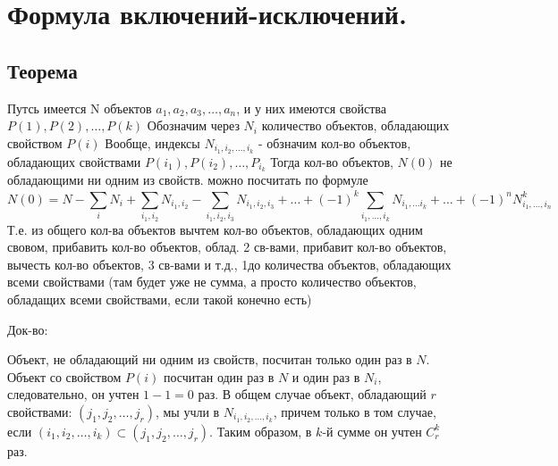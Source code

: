 \section{Формула включений-исключений.}

\subsection{Теорема}

Путсь имеется N объектов $a_1, a_2, a_3, \ldots, a_n$, и у них имеются свойства $P(1), P(2), \ldots ,P(k)$
Обозначим через $N_i$ количество объектов, обладающих свойством $P(i)$
Вообще, индексы $N_{i_1, i_2, \ldots, i_k}$ - обзначим кол-во объектов, 
обладающих свойствами $P(i_1), P(i_2), \ldots , P_{i_k}$
Тогда кол-во объектов, $N(0)$ не обладающими ни одним из свойств. можно посчитать по формуле
$$
N(0) =  N 
- \sum\limits_{i}^{} N_{i} 
+ \sum\limits_{i_1, i_2}^{} N_{i_1, i_2} 
- \sum\limits_{i_1, i_2, i_3}^{} N_{i_1, i_2, i_3} 
+ \ldots 
+ (-1)^k \sum\limits_{i_1, \ldots, i_k}^{} N_{i_1, \ldots i_k} 
+ \ldots
+ (-1)^n N_{i_1, \ldots, i_n}^{k}
$$
Т.е. из общего кол-ва объектов вычтем кол-во объектов, обладающих одним свовом, прибавить кол-во объектов, облад. 2 св-вами, прибавит кол-во объектов, вычесть кол-во объектов, 3 св-вами и т.д., 1до количества объектов, обладающих всеми свойствами (там будет уже не сумма, а просто количество объектов, обладащих всеми свойствами, если такой конечно есть)

Док-во:

Объект, не обладающий ни одним из свойств, посчитан только один раз в $N$. Объект со свойством $P(i)$ посчитан один раз в $N$ и один раз в $N_i$, следовательно, он учтен $1-1=0$ раз. В общем случае объект, обладающий $r$ свойствами: $(j_1, j_2, \dots, j_r)$, мы учли в $N_{i_1, i_2, \dots, i_k}$, причем только в том
случае, если $(i_1, i_2, \dots, i_k) \subset (j_1, j_2, \dots, j_r)$. Таким образом, в $k$-й сумме он учтен $C_r^k$ раз.





